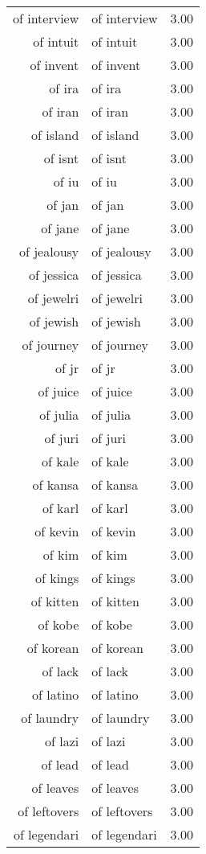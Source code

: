 \begin{table}[ht]
\begin{tabular}{rlr}
  of interview & of interview & 3.00 \\ 
  of intuit & of intuit & 3.00 \\ 
  of invent & of invent & 3.00 \\ 
  of ira & of ira & 3.00 \\ 
  of iran & of iran & 3.00 \\ 
  of island & of island & 3.00 \\ 
  of isnt & of isnt & 3.00 \\ 
  of iu & of iu & 3.00 \\ 
  of jan & of jan & 3.00 \\ 
  of jane & of jane & 3.00 \\ 
  of jealousy & of jealousy & 3.00 \\ 
  of jessica & of jessica & 3.00 \\ 
  of jewelri & of jewelri & 3.00 \\ 
  of jewish & of jewish & 3.00 \\ 
  of journey & of journey & 3.00 \\ 
  of jr & of jr & 3.00 \\ 
  of juice & of juice & 3.00 \\ 
  of julia & of julia & 3.00 \\ 
  of juri & of juri & 3.00 \\ 
  of kale & of kale & 3.00 \\ 
  of kansa & of kansa & 3.00 \\ 
  of karl & of karl & 3.00 \\ 
  of kevin & of kevin & 3.00 \\ 
  of kim & of kim & 3.00 \\ 
  of kings & of kings & 3.00 \\ 
  of kitten & of kitten & 3.00 \\ 
  of kobe & of kobe & 3.00 \\ 
  of korean & of korean & 3.00 \\ 
  of lack & of lack & 3.00 \\ 
  of latino & of latino & 3.00 \\ 
  of laundry & of laundry & 3.00 \\ 
  of lazi & of lazi & 3.00 \\ 
  of lead & of lead & 3.00 \\ 
  of leaves & of leaves & 3.00 \\ 
  of leftovers & of leftovers & 3.00 \\ 
  of legendari & of legendari & 3.00 \\ 

\end{tabular}
\end{table}
